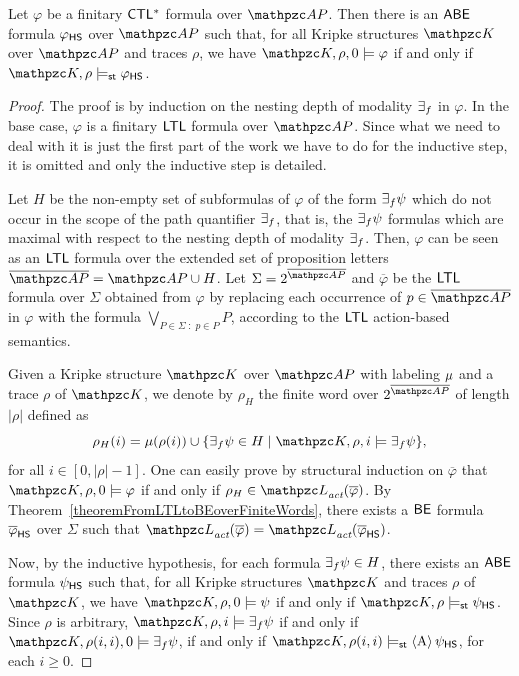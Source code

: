   \begin{theorem}\label{theo:FromFInitaryCTLStarToFutureHSBranching} Let $\varphi$ be a finitary $\text{\sffamily CTL$^{*}$}$ 
  formula over $\Prop$. Then there is an $\mathsf{A}\mathsf{B}\mathsf{E}$ formula $\varphi_{\text{\sffamily HS}}$ over $\Prop$ such that, for all
  Kripke structures $\Ku$ over $\Prop$ and traces $\rho$, we have $\Ku,\rho,0\models \varphi$ if and only if  $\Ku,\rho\models_\stat \varphi_\HS$.
  \end{theorem}
  \begin{proof} The proof is by induction on the nesting depth of modality $\exists_f$ in $\varphi$. In the base case, $\varphi$ is a finitary $\text{\sffamily LTL}$ formula over $\Prop$. Since what we need to deal with it is just the first part of the work we have to do for the inductive step, it is omitted and only the inductive step is detailed. 
  
  Let $H$ be the non-empty set of subformulas of $\varphi$ of the form $\exists_f \psi$ which do not occur in the scope of the path quantifier $\exists_f$, that is, the $\exists_f \psi$ formulas which are maximal with respect to the nesting depth of modality $\exists_f$. Then, $\varphi$ can be seen as an $\text{\sffamily LTL}$ formula over the extended set of proposition letters
  $\overline{\Prop}=\Prop\cup H$. Let $\Sigma = 2^{\overline{\Prop}}$ and $\overline{\varphi}$ be the $\text{\sffamily LTL}$ formula over $\Sigma$
  obtained from $\varphi$ by replacing each occurrence of $p \in \overline{\Prop}$ in $\varphi$ with the formula
  $\bigvee_{P\in \Sigma \; : \; p\in P} P$, according to the $\text{\sffamily LTL}$ action-based semantics. 
  
  Given a Kripke structure  $\Ku$ over $\Prop$ with labeling $\mu$  and a trace $\rho$ of $\Ku$,
  we denote by $\rho_H$ the finite word over $2^{\overline{\Prop}}$ of length $|\rho|$ defined as \[\rho_H(i)= \Lab(\rho(i))\cup \{\EQF\psi\in H\mid\Ku,\rho,i\models \EQF\psi\},\] for all $i\in [0,|\rho|-1]$.
  One can easily prove by structural induction on $\overline{\varphi}$ that $\Ku,\rho,0\models \varphi$ if and only if $\rho_H\in \Lang_\act(\overline{\varphi})$.
  By Theorem~\ref{theoremFromLTLtoBEoverFiniteWords}, there exists a $\mathsf{BE}$ formula $\overline{\varphi}_{\text{\sffamily HS}}$ over $\Sigma$ such that
  $\Lang_\act(\overline{\varphi})= \Lang_\act(\overline{\varphi}_\HS)$.

Now, by the inductive hypothesis, for each formula   $\exists_f \psi\in H$, there exists an $\mathsf{A}\mathsf{B}\mathsf{E}$ formula $\psi_{\text{\sffamily HS}}$ such that,
for all Kripke structures $\Ku$ and traces $\rho$ of $\Ku$, we have
$\Ku,\rho,0\models \psi$ if and only if $\Ku,\rho\models_\stat \psi_\HS$.
%
Since $\rho$ is arbitrary, 
$\Ku,\rho,i\models \EQF\psi$ if and only if $\Ku,\rho(i,i),0\models \EQF\psi$, if and only if $\Ku,\rho(i,i)\models_\stat \hsA\psi_\HS$,
for each $i\geq 0$.


\end{proof}
